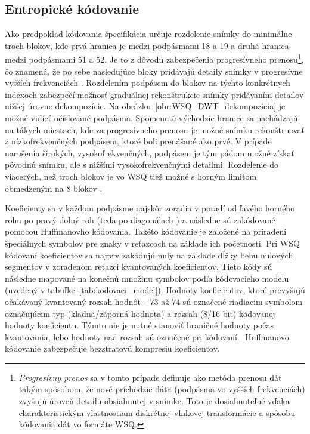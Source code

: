   \subsection{Entropické kódovanie}
  Ako predpoklad kódovania špecifikácia určuje rozdelenie snímky do minimálne troch blokov, kde prvá hranica je medzi podpásmami 18 a 19 a druhá
  hranica medzi podpásmami 51 a 52. Je to z dôvodu zabezpečenia progresívneho prenosu\footnote{\emph{Progresívny prenos} sa v tomto prípade definuje ako
  metóda prenosu dát takým spôsobom, že nové príchodzie dáta (podpásma vo vyšších frekvenciách) zvyšujú úroveň detailu obsiahnutej v snímke.
  Toto je dosiahnuteľné vďaka charakteristickým vlastnostiam diskrétnej vlnkovej transformácie a spôsobu kódovania dát vo formáte WSQ.}, čo znamená,
  že po sebe nasledujúce bloky pridávajú detaily snímky v progresívne vyšších frekvenciách \cite{WSQSpecification}. Rozdelením podpásem do blokov na týchto
  konkrétnych indexoch zabezpečí možnosť graduálnej rekonštrukcie snímky pridávaním detailov nižšej úrovne dekompozície.
  Na obrázku~{\ref{obr:WSQ_DWT_dekompozicia}} je možné vidieť očíslované podpásma. Spomenuté východzie hranice sa nachádzajú na tákych miestach, kde za
  progresívneho prenosu je možné snímku rekonštruovať z nízkofrekvenčných podpásem, ktoré boli prenášané ako prvé. V prípade narušenia širokých,
  vysokofrekvenčných, podpásem je tým pádom možné získať pôvodnú snímku, ale s nižšími vysokofrekvenčnými detailmi.
  Rozdelenie do viacerých, než troch blokov je vo WSQ tiež možné s horným limitom obmedzeným
  na 8 blokov \cite{brislawn1996compression}.

  Koeficienty sa v každom podpásme najskôr zoradia v poradí od ľavého horného rohu po pravý dolný roh (teda po diagonálach )
  a následne sú zakódované pomocou Huffmanovho kódovania. Takéto kódovanie je založené na priradení špeciálnych symbolov pre znaky v reťazcoch na základe
  ich početnosti. Pri WSQ kódovaní koeficientov sa najprv zakódujú nuly na základe dĺžky behu nulových segmentov v zoradenom reťazci kvantovaných koeficientov.
  Tieto kódy sú následne mapované na konečnú množinu symbolov podľa kódovacieho modelu (uvedený v tabuľke~{\ref{tab:kodovaci_model}}). Hodnoty koeficientov,
  ktoré prevyšujú očakávaný kvantovaný rozsah hodnôt $-73$ až $74$ sú označené riadiacim symbolom označujúcim typ (kladná/záporná hodnota) a rozsah (8/16-bit)
  kódovanej hodnoty koeficientu. Týmto nie je nutné stanoviť hraničné hodnoty počas kvantovania, lebo hodnoty nad rozsah sú označené pri
  kódovaní \cite{brislawn1996compression}. Huffmanovo kódovanie zabezpečuje bezstratovú kompresiu koeficientov.

